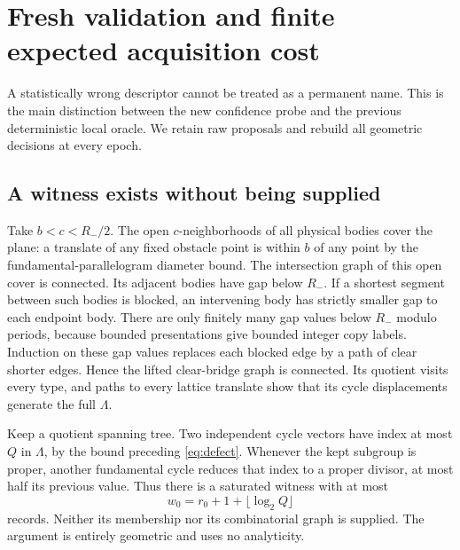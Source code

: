 \section{Fresh validation and finite expected acquisition cost}\label{sec:sequential}
A statistically wrong descriptor cannot be treated as a permanent name.
This is the main distinction between the new confidence probe and the
previous deterministic local oracle. We retain raw proposals and rebuild
all geometric decisions at every epoch.

\subsection{A witness exists without being supplied}
Take $b<c<R_-/2$. The open $c$-neighborhoods of all physical bodies
cover the plane: a translate of any fixed obstacle point is within $b$
of any point by the fundamental-parallelogram diameter bound. The
intersection graph of this open cover is connected. Its adjacent bodies
have gap below $R_-$. If a shortest segment between such bodies is
blocked, an intervening body has strictly smaller gap to each endpoint
body. There are only finitely many gap values below $R_-$ modulo periods,
because bounded presentations give bounded integer copy labels.
Induction on these gap values replaces each blocked edge by a path of
clear shorter edges. Hence the lifted clear-bridge graph is connected.
Its quotient visits every type, and paths to every lattice translate
show that its cycle displacements generate the full $\Lambda$.

Keep a quotient spanning tree. Two independent cycle vectors have index
at most $Q$ in $\Lambda$, by the bound preceding \eqref{eq:defect}.
Whenever the kept subgroup is proper, another fundamental cycle reduces
that index to a proper divisor, at most half its previous value. Thus
there is a saturated witness with at most
\begin{equation}\label{eq:witness}
                     w_0=r_0+1+\lfloor\log_2 Q\rfloor
\end{equation}
records. Neither its membership nor its combinatorial graph is supplied.
The argument is entirely geometric and uses no analyticity.

